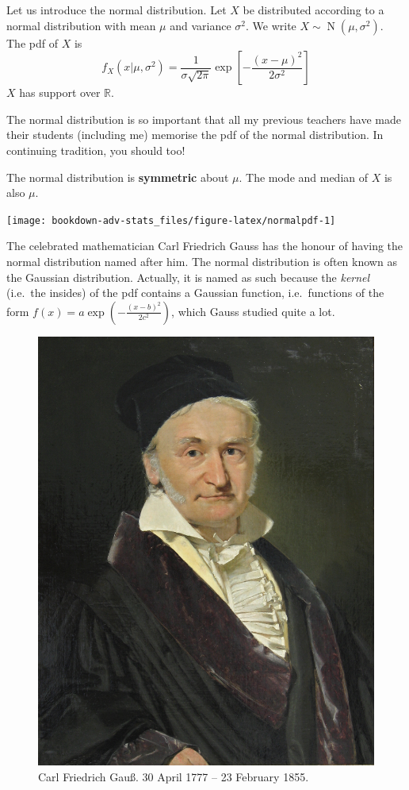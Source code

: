 \documentclass[
]{book}
\DeclareMathOperator{\N}{N}
\newcommand{\bbR}{\mathbb{R}}
\theoremstyle{definition}
\theoremstyle{definition}
\theoremstyle{definition}
\theoremstyle{definition}
\theoremstyle{remark}
\begin{document}
Let us introduce the normal distribution.
Let \(X\) be distributed according to a normal distribution with mean \(\mu\) and variance \(\sigma^2\).
We write \(X\sim\N(\mu,\sigma^2)\).
The pdf of \(X\) is
\[
f_X(x|\mu,\sigma^2)= \frac{1}{\sigma\sqrt{2\pi}}\exp\left[-\frac{(x-\mu)^2}{2\sigma^2} \right]
\]
\(X\) has support over \(\bbR\).

The normal distribution is so important that all my previous teachers have made their students (including me) memorise the pdf of the normal distribution.
In continuing tradition, you should too!

The normal distribution is \textbf{symmetric} about \(\mu\).
The mode and median of \(X\) is also \(\mu\).

\begin{center}\texttt{[image: bookdown-adv-stats\_files/figure-latex/normalpdf-1]} \end{center}

The celebrated mathematician Carl Friedrich Gauss has the honour of having the normal distribution named after him.
The normal distribution is often known as the Gaussian distribution.
Actually, it is named as such because the \emph{kernel} (i.e.~the insides) of the pdf contains a Gaussian function, i.e.~functions of the form \(f(x)=a\exp\left(- \frac{(x-b)^2}{2c^2} \right)\), which Gauss studied quite a lot.

\begin{figure}

{\centering \includegraphics[width=0.6\linewidth]{figure/gauss} 

}

\caption{Carl Friedrich Gauß. 30 April 1777 -- 23 February 1855.}\label{fig:gauss}
\end{figure}
\end{document}
